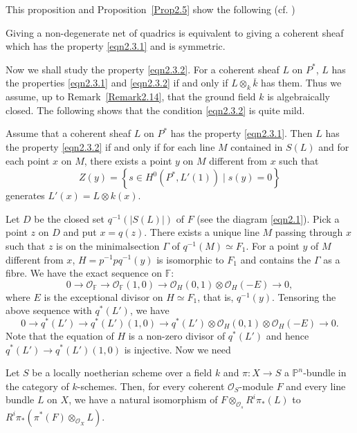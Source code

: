 This proposition and Proposition~\ref{Prop2.5} show the following
(cf. \cite[Proposition~6.23]{key4})
\setcounter{cor}{3}
\begin{cor}\label{cor2.12.4}
Giving a non-degenerate net of quadrics is  equivalent to giving a
coherent sheaf which has the property \eqref{eqn2.3.1} and is symmetric.
\end{cor}

Now we shall study the property \eqref{eqn2.3.2}. For a coherent sheaf
$L$ on $P^{\ast}$, $L$ has the properties \eqref{eqn2.3.1} and
\eqref{eqn2.3.2} if and only if $L\otimes_{k}\overline{k}$ has
them. Thus we assume, up to Remark~\ref{Remark2.14}, that the ground
field $k$ is algebraically closed. The following shows that the
condition \eqref{eqn2.3.2} is quite mild.

\begin{Prop}\label{Prop2.13}
Assume that a coherent sheaf $L$ on $P^{\ast}$ has the property
\eqref{eqn2.3.1}. Then $L$ has the property \eqref{eqn2.3.2} if and
only if for each line $M$ contained in $S(L)$ and for each point $x$
on $M$, there exists a point $y$ on $M$ different from $x$ such that
$$
Z(y)=\left\{s\in H^{0}(P^{\ast},L'(1))\mid s(y)=0\right\}
$$ 
generates $L'(x)=L\otimes k(x)$. 
\end{Prop}

\begin{Proof}
Let $D$ be the closed set $q^{-1}\left(|S(L)|\right)$ of $F$
(see the diagram \eqref{eqn2.1}). Pick a point $z$ on $D$ and put
$x=q(z)$. There exists a unique line $M$ passing through $x$ such that
$z$ is on the minimal\pageoriginale section $\Gamma$ of
$q^{-1}(M)\simeq F_1$. For a point $y$ of $M$ different from $x$,
$H=p^{-1}pq^{-1}(y)$ is isomorphic to $F_1$ and contains the $\Gamma$
as a fibre. We have the exact sequence on $\mathbb{F}$: 
$$
0\to \mathscr{O}_{\mathbb{F}}\to \mathscr{O}_{\mathbb{F}}(1,0)\to
\mathscr{O}_{H}(0,1)\otimes \mathscr{O}_H(-E)\to 0,
$$
where $E$ is the exceptional divisor on $H\simeq F_1$, that is,
$q^{-1}(y)$. Tensoring the above sequence with $q^{\ast}(L')$, we have 
$$
0\to q^{\ast}(L')\to q^{\ast}(L')(1,0)\to q^{\ast}(L')\otimes
\mathscr{O}_{H}(0,1)\otimes \mathscr{O}_H(-E)\to 0.
$$
Note that the equation of $H$ is a non-zero divisor of $q^{\ast}(L')$
and hence $q^{\ast}(L')\to q^{\ast}(L')(1,0)$ is injective. Now we
need 
\end{Proof}

\begin{LEM}\label{LEM2.13.1}
Let $S$ be a locally noetherian scheme over a field $k$ and $\pi:X\to
S$ a $\mathbb{P}^{n}$-bundle in the category of $k$-schemes. Then, for
every coherent $\mathscr{O}_S$-module $F$ and every line bundle $L$ on
$X$, we have a natural isomorphism of
$F\otimes_{\mathscr{O}_{s}}R^{i}\pi_{\ast}(L)$ to
$R^{i}\pi_{\ast}(\pi^{\ast}(F)\otimes_{\mathscr{O}_{X}}L)$.
\end{LEM}

